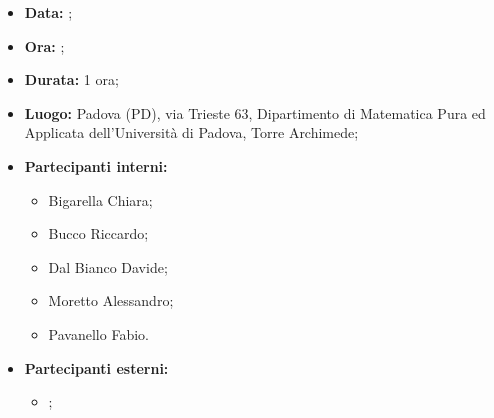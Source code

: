 
\begin{itemize}
	\item \textbf{Data:} ;
	\item \textbf{Ora:} ;
	\item \textbf{Durata:} 1 ora;
	\item \textbf{Luogo:} Padova (PD), via Trieste 63, Dipartimento di Matematica Pura ed Applicata dell’Università di Padova, Torre Archimede;
	\item \textbf{Partecipanti interni:}
	\begin{itemize}
		\item Bigarella Chiara;
		\item Bucco Riccardo;
		\item Dal Bianco Davide;
		\item Moretto Alessandro;
		\item Pavanello Fabio.
	\end{itemize}
	\item \textbf{Partecipanti esterni:}
	\begin{itemize}
		\item \proponente;
	\end{itemize}
\end{itemize}
\newpage
